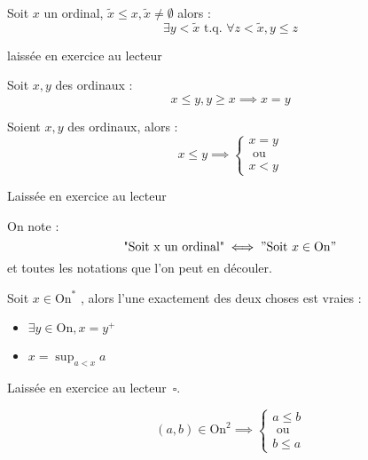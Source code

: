 \begin{theorem}[Minimum]
    Soit \(x\) un ordinal, \(\tilde{x} \leq x , \tilde{x} \neq \emptyset \) alors : 
    \[
        \exists y < \tilde{x} \text{ t.q. } \forall z < \tilde{x}, y \leq z
    \]
\end{theorem}

\begin{explanation}
    laissée en exercice au lecteur
\end{explanation}
\begin{theorem}[Egalité]
    Soit \(x, y \) des ordinaux : 
    \[
        x\leq y, y\geq x \implies x=y
    \]
\end{theorem}

\begin{theorem}[thm]
    Soient \(x,y\) des ordinaux, alors : 
    \[
        x\leq y \implies \begin{cases}
            x = y\\
            \text{ ou } \\
            x<y
        \end{cases}
    \]
\end{theorem}

\begin{explanation}
    Laissée en exercice au lecteur
\end{explanation}

\begin{notation}
    On note : 
    \[
        \text{"Soit x un ordinal"} \iff "\text{Soit } x \in \mathrm{On}"
    \]
    et toutes les notations que l'on peut en découler.
\end{notation}

\begin{theorem}
    Soit \( x \in \mathrm{On}^{*}\) , alors l'une exactement des deux choses est vraies  :
    \begin{itemize}
        \item \(\exists y \in \mathrm{On} , x = y^{+}\) \\
        \item \(x = \sup_{a<x} a\)  
    \end{itemize} 
\end{theorem}

\begin{explanation}
    Laissée en exercice au lecteur \(\,\square\).
\end{explanation}

\begin{theorem}
    \[
        (a,b) \in \mathrm{On}^{2} \implies \begin{cases}
            a \leq b \\
            \text{ ou } \\
            b\leq a
        \end{cases}
    \]
\end{theorem}

